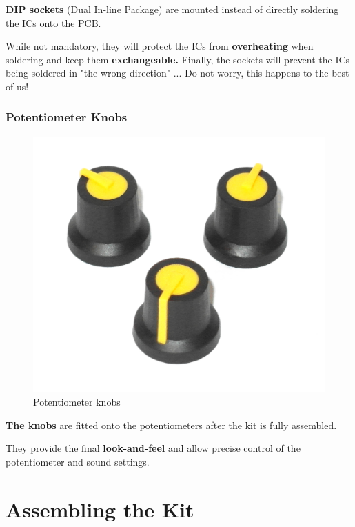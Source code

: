 \documentclass{scrartcl}
\begin{document}
\textbf{DIP sockets} (Dual In-line Package) are mounted instead of directly soldering the ICs onto the PCB.

While not mandatory, they will protect the ICs from \textbf{overheating} when soldering and keep them \textbf{exchangeable.} Finally, the sockets will prevent the ICs being soldered in "the wrong direction" ... Do not worry, this happens to the best of us!

\subsubsection{Potentiometer Knobs}

\begin{figure}[!ht]
    \begin{center}
        \includegraphics[scale=0.15]{assets/zekit-knobs.jpg}
        \caption{Potentiometer knobs}
    \end{center}
\end{figure}

\textbf{The knobs} are fitted onto the potentiometers after the kit is fully assembled.

They provide the final \textbf{look-and-feel} and allow precise control of the potentiometer and sound settings.

\pagebreak

\section{Assembling the Kit}
\end{document}
